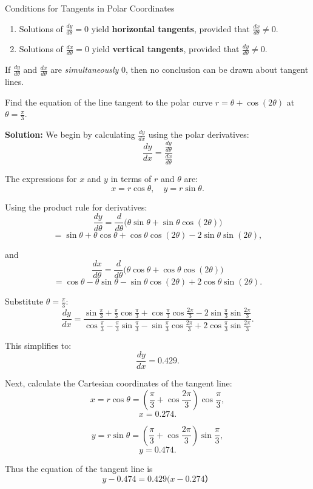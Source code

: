 \documentclass[12pt]{article}
\theoremstyle{beautifulthm}
\begin{document}
\begin{Note}{Conditions for Tangents in Polar Coordinates}{}
    \begin{enumerate}
    \item Solutions of \( \frac{dy}{d\theta} = 0 \) yield \textbf{horizontal tangents}, provided that \( \frac{dx}{d\theta} \neq 0 \).
    \item Solutions of \( \frac{dx}{d\theta} = 0 \) yield \textbf{vertical tangents}, provided that \( \frac{dy}{d\theta} \neq 0 \).
\end{enumerate}

If \( \frac{dy}{d\theta} \) and \( \frac{dx}{d\theta} \) are \textit{simultaneously} \( 0 \), then no conclusion can be drawn about tangent lines.
\end{Note}

\begin{tcolorbox}[colback=examplebg, colframe=red!75!black, title=\textbf{EXAMPLE 5: Find the EOTL}, fonttitle=\bfseries, sharp corners]

Find the equation of the line tangent to the polar curve \( r = \theta + \cos(2\theta) \) at \( \theta = \frac{\pi}{3} \).

\tcblower
\textbf{Solution:} 
We begin by calculating \( \frac{dy}{dx} \) using the polar derivatives:
\[
\frac{dy}{dx} = \frac{\frac{dy}{d\theta}}{\frac{dx}{d\theta}}
\]

The expressions for \( x \) and \( y \) in terms of \( r \) and \( \theta \) are:
\[
x = r \cos\theta, \quad y = r \sin\theta.
\]

Using the product rule for derivatives:
\[
\frac{dy}{d\theta} = \frac{d}{d\theta}\big(\theta \sin\theta + \sin\theta \cos(2\theta)\big)
\]
\[
= \sin\theta + \theta \cos\theta + \cos\theta \cos(2\theta) - 2\sin\theta \sin(2\theta),
\]

and
\[
\frac{dx}{d\theta} = \frac{d}{d\theta}\big(\theta \cos\theta + \cos\theta \cos(2\theta)\big)
\]
\[
= \cos\theta - \theta \sin\theta - \sin\theta \cos(2\theta) + 2\cos\theta \sin(2\theta).
\]

Substitute \( \theta = \frac{\pi}{3} \):
\[
\frac{dy}{dx} = \frac{\sin\frac{\pi}{3} + \frac{\pi}{3}\cos\frac{\pi}{3} + \cos\frac{\pi}{3}\cos\frac{2\pi}{3} - 2\sin\frac{\pi}{3}\sin\frac{2\pi}{3}}{\cos\frac{\pi}{3} - \frac{\pi}{3}\sin\frac{\pi}{3} - \sin\frac{\pi}{3}\cos\frac{2\pi}{3} + 2\cos\frac{\pi}{3}\sin\frac{2\pi}{3}}.
\]

This simplifies to:
\[
\frac{dy}{dx} = 0.429.
\]

Next, calculate the Cartesian coordinates of the tangent line:
\[
x = r \cos\theta = \left(\frac{\pi}{3} + \cos\frac{2\pi}{3}\right)\cos\frac{\pi}{3},
\]
\[
x = 0.274.
\]

\[
y = r \sin\theta = \left(\frac{\pi}{3} + \cos\frac{2\pi}{3}\right)\sin\frac{\pi}{3},
\]
\[
y = 0.474.
\]

Thus the equation of the tangent line is
\[y-0.474 = 0.429(x-0.274）\]

\end{tcolorbox}
\end{document}
